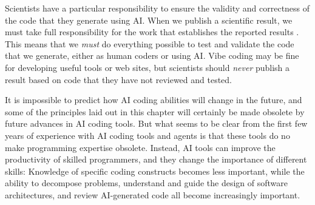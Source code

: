 Scientists have a particular responsibility to ensure the validity and correctness of the code that they generate using AI.  When we publish a scientific result, we must take full responsibility for the work that establishes the reported results \citep{Bridgeford:2025aa}.  This means that we \textit{must} do everything possible to test and validate the code that we generate, either as human coders or using AI.  Vibe coding may be fine for developing useful tools or web sites, but scientists should \textit{never} publish a result based on code that they have not reviewed and tested.

It is impossible to predict how AI coding abilities will change in the future, and some of the principles laid out in this chapter will certainly be made obsolete by future advances in AI coding tools. But what seems to be clear from the first few years of experience with AI coding tools and agents is that these tools do no make programming expertise obsolete.
Instead, AI tools can improve the productivity of skilled programmers, and they change the importance of different skills: Knowledge of specific coding constructs becomes less important, while the ability to decompose problems, understand and guide the design of software architectures, and review AI-generated code all become increasingly important.